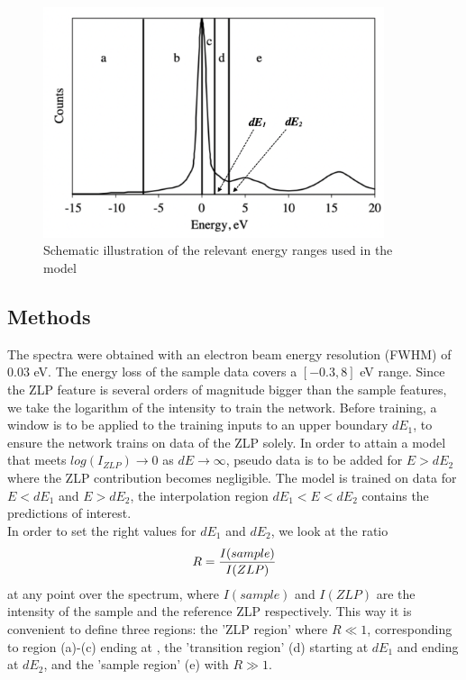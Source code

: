 \documentclass[11pt,a4paper]{article}
\def\frac#1#2{{{#1}\over {#2}}}
\numberwithin{equation}{section}
\numberwithin{figure}{section}
\numberwithin{table}{section}
\begin{document}
\begin{figure}[H]
    \centering
    \includegraphics[width=100mm]{plots/ranges.png}
    \caption{Schematic illustration of the relevant energy ranges used in the model}
    \label{ranges}
\end{figure}

\subsection{Methods}
The spectra were obtained with an electron beam energy resolution (FWHM) of $0.03$ eV. 
The energy loss of the sample data covers a $[-0.3, 8]$ eV range. Since the ZLP feature is several orders of magnitude bigger than the sample features, we take the logarithm of the intensity to train the network. Before training, a window is to be applied to the training inputs to an upper boundary $dE_1$, to ensure the network trains on data of the ZLP solely. In order to attain a model that meets $log(I_{ZLP}) \rightarrow 0$ as $dE \rightarrow \infty$, pseudo data is to be added for $E>dE_2$ where the ZLP contribution becomes negligible. The model is trained on data for $E<dE_1$ and $E>dE_2$, the interpolation region $dE_1 < E < dE_2$ contains the predictions of interest. \\

In order to set the right values for $dE_1$ and $dE_2$, we look at the ratio 
\begin{equation}
    R = \frac{I(sample)}{I(ZLP)}
\end{equation}
at any point over the spectrum, where $I(sample)$ and $I(ZLP)$ are the intensity of the sample and the reference ZLP respectively. This way it is convenient to define three regions: the 'ZLP region' where $R\ll1$, corresponding to region (a)-(c) ending at , the 'transition region' (d) starting at $dE_1$ and ending at $dE_2$, and the 'sample region' (e) with $R\gg1$.\\
\end{document}
